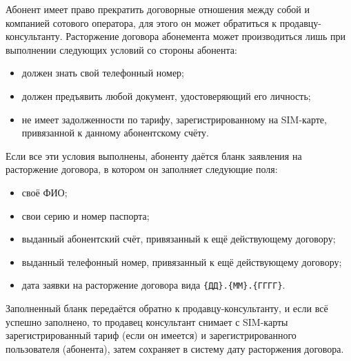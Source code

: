 Абонент имеет право прекратить договорные отношения между собой и компанией сотового оператора, для этого он может обратиться к продавцу-консультанту. Расторжение договора абонемента может производиться лишь при выполнении следующих условий со стороны абонента:
\begin{itemize}
    \item должен знать свой телефонный номер;
    \item должен предъявить любой документ, удостоверяющий его личность;
    \item не имеет задолженности по тарифу, зарегистрированному на SIM-карте, привязанной к данному абонентскому счёту.
\end{itemize} 

Если все эти условия выполнены, абоненту даётся бланк заявления на расторжение договора, в котором он заполняет следующие поля:
\begin{itemize}
    \item своё ФИО;
    \item свои серию и номер паспорта;
    \item выданный абонентский счёт, привязанный к ещё действующему договору;
    \item выданный телефонный номер, привязанный к ещё действующему договору;
    \item дата заявки на расторжение договора вида \texttt{\{ДД\}.\{ММ\}.\{ГГГГ\}}.
\end{itemize}

Заполненный бланк передаётся обратно к продавцу-консультанту, и если всё успешно заполнено, то продавец консультант снимает с SIM-карты зарегистрированный тариф (если он имеется) и зарегистрированного пользователя (абонента), затем сохраняет в систему дату расторжения договора.





